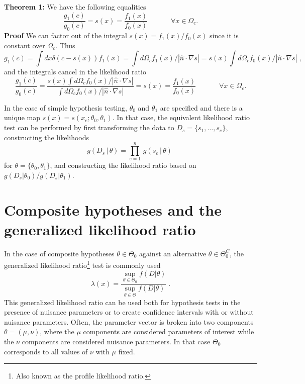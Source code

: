 \documentclass[11pt, oneside]{article}   	%
\begin{document}
\textbf{\flushleft Theorem 1:}
We have the following equalities
\begin{equation}
\frac{g_1(c)}{g_0(c)} = s(x) = \frac{f_1(x)}{f_0(x)}  \;\hspace{3em} \forall x\in\Omega_c.
\end{equation}
\textbf{Proof}
We can factor out of the integral $s(x)=f_1(x)/f_0(x)$ since it is constant over $\Omega_c$.
Thus
\begin{equation}
g_1(c) = \int dx \delta(c-s(x)) f_1(x) = \int d\Omega_c f_1(x) / | \hat{n} \cdot \nabla s  |= s(x) \int d\Omega_c f_0(x)  / | \hat{n} \cdot \nabla s  | \;,
\end{equation}
and the integrals cancel in the likelihood ratio
\begin{equation}
\frac{g_1(c)}{g_0(c)} = \frac{s(x) \int d\Omega_c f_0(x)/ | \hat{n} \cdot \nabla s  |}{ \int d\Omega_c f_0(x) / | \hat{n} \cdot \nabla s  |} = s(x) = \frac{f_1(x)}{f_0(x)}  \;\hspace{3em} \forall x\in\Omega_c.
\end{equation}

\bigskip
In the case of simple hypothesis testing, $\theta_0$ and $\theta_1$ are specified and there is a unique map $s(x) =  s(x_e; \theta_0, \theta_1)$. In that case, the equivalent likelihood ratio test can be performed by first transforming the data to $D_s = \{s_1, \dots, s_e\}$, constructing the likelihoods
\begin{equation}\label{eq:NP}
g( D_s \,|\,  \theta) = \prod_{e=1}^n \,  g( s_e \, |\,  \theta)   \; 
\end{equation}
for $\theta=\{\theta_0,\theta_1\}$, and constructing the likelihood ratio based on $g(D_s|\theta_0)/g(D_s|\theta_1)$.



\section{Composite hypotheses and the generalized likelihood ratio}

In the case of composite hypotheses $\theta \in \Theta_0$ against an alternative $\theta \in \Theta_0^C$, the generalized likelihood ratio\footnote{Also known as the profile likelihood ratio.} test is commonly used
\begin{equation}
\lambda(x) =  \frac{ \sup_{\theta \in \Theta_0} f(D | \theta)}{ \sup_{\theta \in \Theta} f(D | \theta)} \; .
\end{equation}
This generalized likelihood ratio can be used both for hypothesis tests in the presence of nuisance parameters or to create confidence intervals with or without nuisance parameters.  Often, the parameter vector is broken into two components $\theta=(\mu,\nu)$, where the $\mu$ components are considered parameters of interest while the $\nu$ components are considered nuisance parameters. In that case $\Theta_0$ corresponds to all values of $\nu$ with $\mu$ fixed.
\end{document}
